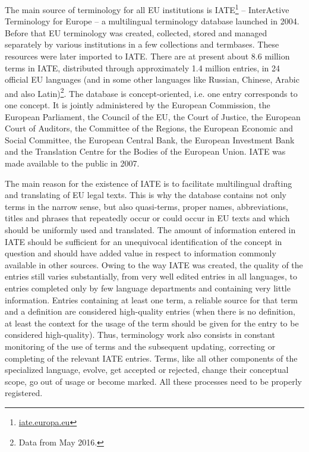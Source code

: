 \documentclass[output=paper]{langsci/langscibook}
\begin{document}
The main source of terminology for all EU institutions is IATE\footnote{\url{iate.europa.eu}} – InterActive Terminology for Europe – a multilingual terminology database launched in 2004. Before that EU terminology was created, collected, stored and managed separately by various institutions in a few collections and termbases. These resources were later imported to IATE. There are at present about 8.6 million terms in IATE, distributed through approximately 1.4 million entries, in 24 official EU languages (and in some other languages like Russian, Chinese, Arabic and also Latin)\footnote{Data from May 2016.}. The database is concept-oriented, i.e. one entry corresponds to one concept. It is jointly administered by the European Commission, the European Parliament, the Council of the EU, the Court of Justice, the European Court of Auditors, the Committee of the Regions, the European Economic and Social Committee, the European Central Bank, the European Investment Bank and the Translation Centre for the Bodies of the European Union. IATE was made available to the public in 2007.

The main reason for the existence of IATE is to facilitate multilingual drafting and translating of EU legal texts. This is why the database contains not only terms in the narrow sense, but also quasi-terms, proper names, abbreviations, titles and phrases that repeatedly occur or could occur in EU texts and which should be uniformly used and translated. The amount of information entered in IATE should be sufficient for an unequivocal identification of the concept in question and should have added value in respect to information commonly available in other sources. Owing to the way IATE was created, the quality of the entries still varies substantially, from very well edited entries in all languages, to entries completed only by few language departments and containing very little information. Entries containing at least one term, a reliable source for that term and a definition are considered high-quality entries (when there is no definition, at least the context for the usage of the term should be given for the entry to be considered high-quality). Thus, terminology work also consists in constant monitoring of the use of terms and the subsequent updating, correcting or completing of the relevant IATE entries. Terms, like all other components of the specialized language, evolve, get accepted or rejected, change their conceptual scope, go out of usage or become marked. All these processes need to be properly registered.
\end{document}
